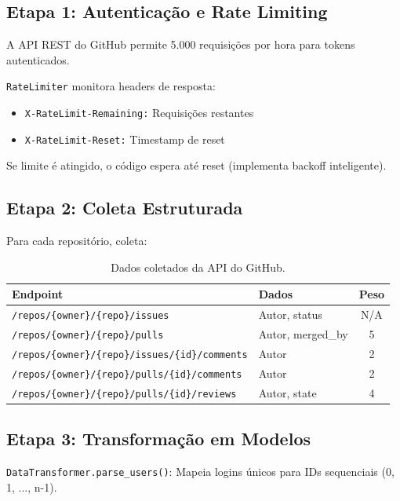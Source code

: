 \documentclass[12pt,a4paper]{article}
\begin{document}
\subsection{Etapa 1: Autenticação e Rate Limiting}

A API REST do GitHub permite 5.000 requisições por hora para tokens autenticados.

\texttt{RateLimiter} monitora headers de resposta:
\begin{itemize}
  \item \texttt{X-RateLimit-Remaining:} Requisições restantes
  \item \texttt{X-RateLimit-Reset:} Timestamp de reset
\end{itemize}

Se limite é atingido, o código espera até reset (implementa backoff inteligente).

\subsection{Etapa 2: Coleta Estruturada}

Para cada repositório, coleta:

\begin{table}[h]
  \centering
  \caption{Dados coletados da API do GitHub.}
  \label{tab:coleta}
  \begin{tabular}{l|l|c}
    \toprule
    \textbf{Endpoint} & \textbf{Dados} & \textbf{Peso} \\
    \midrule
    \texttt{/repos/\{owner\}/\{repo\}/issues} & Autor, status & N/A \\
    \texttt{/repos/\{owner\}/\{repo\}/pulls} & Autor, merged\_by & 5 \\
    \texttt{/repos/\{owner\}/\{repo\}/issues/\{id\}/comments} & Autor & 2 \\
    \texttt{/repos/\{owner\}/\{repo\}/pulls/\{id\}/comments} & Autor & 2 \\
    \texttt{/repos/\{owner\}/\{repo\}/pulls/\{id\}/reviews} & Autor, state & 4 \\
    \bottomrule
  \end{tabular}
\end{table}

\subsection{Etapa 3: Transformação em Modelos}

\texttt{DataTransformer.parse\_users()}: Mapeia logins únicos para IDs sequenciais (0, 1, ..., n-1).
\end{document}
